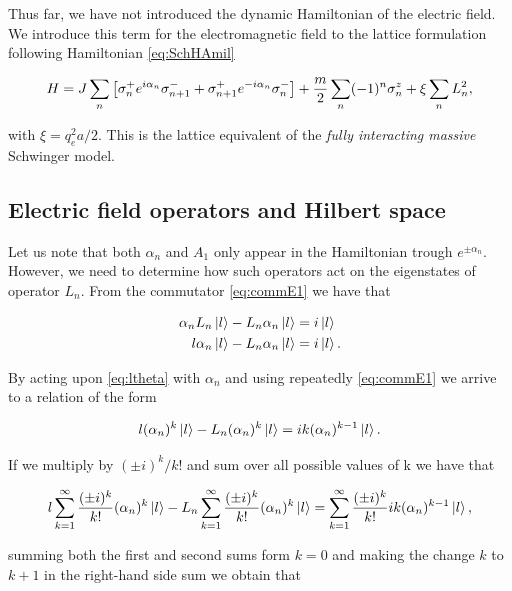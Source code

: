 Thus far, we have not introduced the dynamic Hamiltonian of the electric field. We introduce this term for the electromagnetic field to the lattice formulation following Hamiltonian \eqref{eq:SchHAmil}

\begin{equation}
H = J\sum_n\qty[\sigma^+_n e^{i\alpha_n}  \sigma^-_{n+1} + \sigma^+_{n+1} e^{-i\alpha_n}\sigma^-_n] + \frac{m}{2}\sum_n (-1)^n\sigma^z_n + \xi \sum_n L_n^2,\label{eq:fullHamiltonian}
\end{equation}

with $\xi = q_e^2 a/2$. This is the lattice equivalent of the \emph{fully interacting massive} Schwinger model.\\

\subsection{Electric field operators and Hilbert space}\label{ssec:operators}

 Let us note that both $\alpha_n$ and $A_1$ only appear in the Hamiltonian trough $e^{\pm\alpha_n}$. However, we need to determine how such operators act on the eigenstates of operator $L_n$. From the commutator \eqref{eq:commE1} we have that
 
 \begin{align}
 	\alpha_n L_n\ket{l} - L_n\alpha_n\ket{l} &= i\ket{l} \nonumber\\
 	l\alpha_n\ket{l} - L_n\alpha_n\ket{l} &= i\ket{l}\label{eq:ltheta}.
 \end{align}
 
 By acting upon \eqref{eq:ltheta} with $\alpha_n$ and using repeatedly \eqref{eq:commE1} we arrive to a relation of the form
 
 \begin{equation*}
 	l(\alpha_n)^k\ket{l} - L_n(\alpha_n)^k\ket{l} = i k (\alpha_n)^{k-1}\ket{l}.
 \end{equation*}
 
 If we multiply by $(\pm i)^k/k!$ and sum over all possible values of k we have that
 
 \begin{equation}
 l\sum_{k=1}^\infty\frac{(\pm i)^k}{k!} (\alpha_n)^k \ket{l} - L_n \sum_{k=1}^\infty\frac{(\pm i)^k}{k!} (\alpha_n)^k \ket{l}  = \sum_{k=1}^\infty\frac{(\pm i)^k}{k!} i k (\alpha_n)^{k-1}\ket{l},
 \end{equation}
 
 summing both the first and second sums form $k=0$ and making the change $k$ to $k+1$ in the right-hand side sum we obtain that
 
